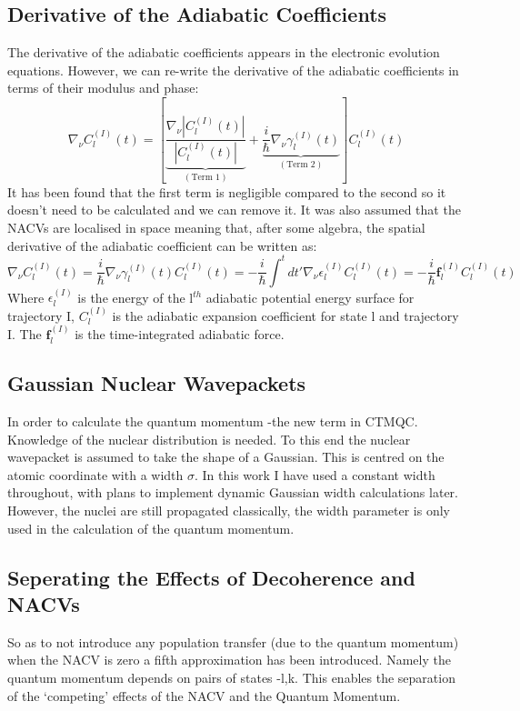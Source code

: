 \subsection{Derivative of the Adiabatic Coefficients}
The derivative of the adiabatic coefficients appears in the electronic evolution equations. However, we can re-write the derivative of the adiabatic coefficients in terms of their modulus and phase:
\begin{equation}
  \nabla_{\nu} C_{l}^{(I)}(t) = \left[ \underbrace{\frac{\nabla_{\nu} |C_{l}^{(I)}(t)|}{|C_{l}^{(I)}(t)|}}_{(\text{Term 1})} + \underbrace{\frac{i}{\hbar} \nabla_{\nu} \gamma_{l}^{(I)}(t)}_{(\text{Term 2})}\right] C_{l}^{(I)}(t)
\end{equation}
It has been found that the first term is negligible compared to the second \cite{abedi_dynamical_2013, agostini_mixed_2013, agostini_exact_2015} so it doesn't need to be calculated and we can remove it. It was also assumed that the NACVs are localised in space meaning that, after some algebra, the spatial derivative of the adiabatic coefficient can be written as:
\begin{equation}
  \nabla_{\nu} C_{l}^{(I)}(t) = \frac{i}{\hbar} \nabla_{\nu} \gamma_{l}^{(I)}(t) C_{l}^{(I)}(t) = -\frac{i}{\hbar} \int^{t} dt' \nabla_{\nu} \epsilon_{l}^{(I)} C_{l}^{(I)}(t) = -\frac{i}{\hbar} \textbf{f}_{l}^{(I)} C_{l}^{(I)}(t)
  \label{eq:hist_force}
\end{equation}
Where $\epsilon_{l}^{(I)}$ is the energy of the l$^{th}$ adiabatic potential energy surface for trajectory I, $C_{l}^{(I)}$ is the adiabatic expansion coefficient for state l and trajectory I. The $\textbf{f}_{l}^{(I)}$ is the time-integrated adiabatic force.
\subsection{Gaussian Nuclear Wavepackets}
In order to calculate the quantum momentum -the new term in CTMQC. Knowledge of the nuclear distribution is needed. To this end the nuclear wavepacket is assumed to take the shape of a Gaussian. This is centred on the atomic coordinate with a width $\sigma$. In this work I have used a constant width throughout, with plans to implement dynamic Gaussian width calculations later. However, the nuclei are still propagated classically, the width parameter is only used in the calculation of the quantum momentum.
\subsection{Seperating the Effects of Decoherence and NACVs}
So as to not introduce any population transfer (due to the quantum momentum) when the NACV is zero a fifth approximation has been introduced. Namely the quantum momentum depends on pairs of states -l,k. This enables the separation of the `competing' effects of the NACV and the Quantum Momentum.
